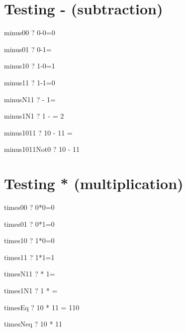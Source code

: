 \documentclass{article}
\begin{document}
\section{Testing - (subtraction)}
\begin{theorem}{minus00}  \vdash?   0-0=0 \end{theorem}
\begin{theorem}{minus01}  \vdash?   0-1=  \end{theorem}
\begin{theorem}{minus10}  \vdash?   1-0=1 \end{theorem}
\begin{theorem}{minus11}  \vdash?   1-1=0 \end{theorem}
\begin{theorem}{minusN11} \vdash?    - 1=  \end{theorem}
\begin{theorem}{minus1N1} \vdash?   1 -  = 2 \end{theorem}
\begin{theorem}{minus1011} \vdash?   10 - 11 =  \end{theorem}
\begin{theorem}{minus1011Not0} \vdash?   10 - 11  \end{theorem}


\section{Testing * (multiplication)}
\begin{theorem}{times00}  \vdash?   0*0=0 \end{theorem}
\begin{theorem}{times01}  \vdash?   0*1=0 \end{theorem}
\begin{theorem}{times10}  \vdash?   1*0=0 \end{theorem}
\begin{theorem}{times11}  \vdash?   1*1=1 \end{theorem}
\begin{theorem}{timesN11} \vdash?    * 1=  \end{theorem}
\begin{theorem}{times1N1} \vdash?   1 *  =  \end{theorem}
\begin{theorem}{timesEq}  \vdash?   10 * 11 = 110 \end{theorem}
\begin{theorem}{timesNeq} \vdash?   10 * 11  \end{theorem}
\end{document}
